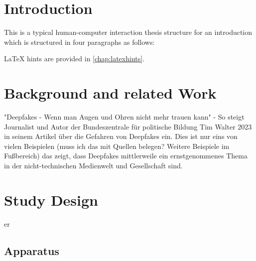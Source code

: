 %
%


\chapter{Introduction}
\label{sec:introduction}

This is a typical human-computer interaction thesis structure for an introduction which is structured in four paragraphs as follows:




LaTeX hints are provided in \autoref{chap:latexhints}.

\chapter{Background and related Work}

"Deepfakes - Wenn man Augen und Ohren nicht mehr trauen kann" - So steigt Journalist und Autor der Bundeszentrale für politische Bildung Tim Walter 2023 in seinem Artikel über die Gefahren von Deepfakes ein.
Dies ist nur eins von vielen Beispielen (muss ich das mit Quellen belegen? Weitere Beispiele im Fußbereich) das zeigt, 
dass Deepfakes mittlerweile ein ernstgenommenes Thema in der nicht-technischen Medienwelt und Gesellschaft sind. 

\chapter{Study Design}

\gls{er}

\section{Apparatus}


